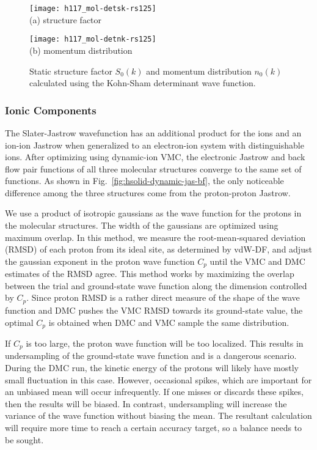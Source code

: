 \begin{figure}[h]
\centering
\begin{minipage}{0.49\textwidth}
\centering
\texttt{[image: h117\_mol-detsk-rs125]}\\
(a) structure factor
\end{minipage}
\begin{minipage}{0.49\textwidth}
\centering
\texttt{[image: h117\_mol-detnk-rs125]}\\
(b) momentum distribution
\end{minipage}
\caption{Static structure factor $S_0(k)$ and momentum distribution $n_0(k)$ calculated using the Kohn-Sham determinant wave function.}
\label{fig:hsolid-det-sk-nk}
\end{figure}

\subsubsection{Ionic Components}
The Slater-Jastrow wavefunction has an additional product for the ions and an ion-ion Jastrow when generalized to an electron-ion system with distinguishable ions.
After optimizing using dynamic-ion VMC, the electronic Jastrow and back flow pair functions of all three molecular structures converge to the same set of functions.
As shown in Fig.~\ref{fig:hsolid-dynamic-jas-bf}, the only noticeable difference among the three structures come from the proton-proton Jastrow.

We use a product of isotropic gaussians as the wave function for the protons in the molecular structures.
The width of the gaussians are optimized using maximum overlap.
In this method, we measure the root-mean-squared deviation (RMSD) of each proton from its ideal site, as determined by vdW-DF, and adjust the gaussian exponent in the proton wave function $C_p$ until the VMC and DMC estimates of the RMSD agree.
This method works by maximizing the overlap between the trial and ground-state wave function along the dimension controlled by $C_p$.
Since proton RMSD is a rather direct measure of the shape of the wave function and DMC pushes the VMC RMSD towards its ground-state value, the optimal $C_p$ is obtained when DMC and VMC sample the same distribution.

If $C_p$ is too large, the proton wave function will be too localized.
This results in undersampling of the ground-state wave function and is a dangerous scenario.
During the DMC run, the kinetic energy of the protons will likely have mostly small fluctuation in this case.
However, occasional spikes, which are important for an unbiased mean will occur infrequently.
If one misses or discards these spikes, then the results will be biased.
In contrast, undersampling will increase the variance of the wave function without biasing the mean.
The resultant calculation will require more time to reach a certain accuracy target, so a balance needs to be sought.

